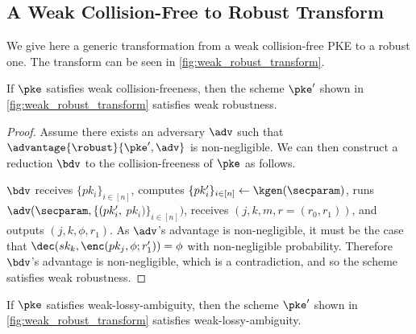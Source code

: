 \subsection{A Weak Collision-Free to Robust Transform}

We give here a generic transformation from a weak collision-free PKE to a robust one.
The transform can be seen in \cref{fig:weak_robust_transform}.



\begin{theorem}
	If $\pke$ satisfies weak collision-freeness, then the scheme $\pke'$ shown in \cref{fig:weak_robust_transform} satisfies weak robustness.
\end{theorem}

\begin{proof}
	Assume there exists an adversary $\adv$ such that $\advantage{\robust}{\pke', \adv}$ is non-negligible.
	We can then construct a reduction $\bdv$ to the collision-freeness of $\pke$ as follows.

	$\bdv$ receives $\{pk_i\}_{i\in[n]}$, computes $\{pk_i'\}_{i\in [n]} \leftarrow \kgen(\secparam)$, runs $\adv(\secparam, \{(pk'_i,$ $ pk_i)\}_{i\in[n]})$, receives $(j, k, m, r = (r_0, r_1))$, and outputs $(j, k, \phi, r_1)$.
	As $\adv$'s advantage is non-negligible, it must be the case that $\dec(sk_k, \enc(pk_j, \phi; r_1')) = \phi$ with non-negligible probability.
	Therefore $\bdv$'s advantage is non-negligible, which is a contradiction, and so the scheme satisfies weak robustness.
\end{proof}

\begin{theorem}
	If $\pke$ satisfies weak-lossy-ambiguity, then the scheme $\pke'$ shown in \cref{fig:weak_robust_transform} satisfies weak-lossy-ambiguity.
\end{theorem}

